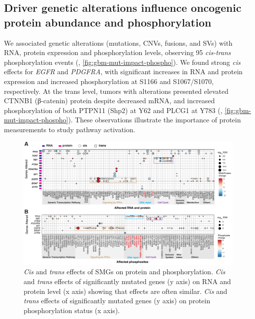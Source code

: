 \subsection{Driver genetic alterations influence oncogenic protein abundance and phosphorylation}
We associated genetic alterations (mutations, CNVs, fusions, and SVs) with RNA, protein expression and phosphorylation levels, observing 95 \textit{cis-trans} phosphorylation events (, \ref{fig:gbm-mut-impact-phospho}). We found strong \textit{cis} effects for \textit{EGFR} and \textit{PDGFRA}, with significant increases in RNA and protein expression and increased phosphorylation at S1166 and S1067/S1070, respectively. At the trans level, tumors with  alterations presented elevated CTNNB1 (β-catenin) protein despite decreased mRNA, and increased phosphorylation of both PTPN11 (Shp2) at Y62 and PLCG1 at Y783 (, \ref{fig:gbm-mut-impact-phospho}). These observations illustrate the importance of protein measurements to study pathway activation.

\begin{figure}[tb]
    \centering
    \includegraphics[width=\linewidth]{figures/chap04_cptac_gbm_discov/figure2_mut_impact.pdf}
    \caption[\textit{Cis} and \textit{trans} effects of SMGs on RNA, protein, and phosphorylation abundance.]{%
        \textit{Cis} and \textit{trans} effects of SMGs on protein and phosphorylation.
        \textit{Cis} and \textit{trans} effects of significantly mutated genes (y axis) on RNA and protein level (x axis) showing that effects are often similar.
        \textit{Cis} and \textit{trans} effects of significantly mutated genes (y axis) on protein phosphorylation status (x axis).
    }
    \label{fig:gbm-mut-impact}
\end{figure}

